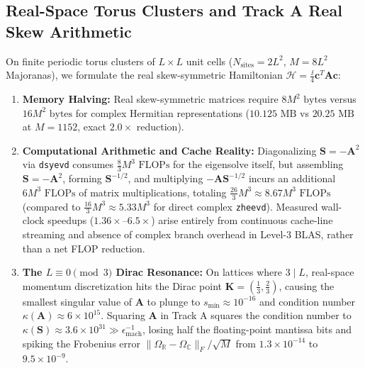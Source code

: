 \subsection{Real-Space Torus Clusters and Track A Real Skew Arithmetic}
On finite periodic torus clusters of $L \times L$ unit cells ($N_{\mathrm{sites}} = 2L^2$, $M = 8L^2$ Majoranas), we formulate the real skew-symmetric Hamiltonian $\mathcal{H} = \frac{\ii}{4} \mathbf{c}^T \mathbf{A} \mathbf{c}$:
\begin{enumerate}
\item \textbf{Memory Halving:} Real skew-symmetric matrices require $8 M^2 \text{ bytes}$ versus $16 M^2 \text{ bytes}$ for complex Hermitian representations ($10.125\text{ MB}$ vs $20.25\text{ MB}$ at $M=1152$, exact $2.0\times$ reduction).
\item \textbf{Computational Arithmetic and Cache Reality:} Diagonalizing $\mathbf{S} = -\mathbf{A}^2$ via \texttt{dsyevd} consumes $\frac{8}{3} M^3 \text{ FLOPs}$ for the eigensolve itself, but assembling $\mathbf{S} = -\mathbf{A}^2$, forming $\mathbf{S}^{-1/2}$, and multiplying $-\mathbf{A}\mathbf{S}^{-1/2}$ incurs an additional $6 M^3 \text{ FLOPs}$ of matrix multiplications, totaling $\frac{26}{3} M^3 \approx 8.67 M^3 \text{ FLOPs}$ (compared to $\frac{16}{3} M^3 \approx 5.33 M^3$ for direct complex \texttt{zheevd}). Measured wall-clock speedups ($1.36\times\text{--}6.5\times$) arise entirely from continuous cache-line streaming and absence of complex branch overhead in Level-3 BLAS, rather than a net FLOP reduction.
\item \textbf{The $L \equiv 0 \pmod 3$ Dirac Resonance:} On lattices where $3 \mid L$, real-space momentum discretization hits the Dirac point $\mathbf{K} = (\frac{1}{3}, \frac{2}{3})$, causing the smallest singular value of $\mathbf{A}$ to plunge to $s_{\min} \approx 10^{-16}$ and condition number $\kappa(\mathbf{A}) \approx 6 \times 10^{15}$. Squaring $\mathbf{A}$ in Track A squares the condition number to $\kappa(\mathbf{S}) \approx 3.6 \times 10^{31} \gg \epsilon_{\mathrm{mach}}^{-1}$, losing half the floating-point mantissa bits and spiking the Frobenius error $\|\Omega_{\mathbb{R}} - \Omega_{\mathbb{C}}\|_F / \sqrt{M}$ from $1.3 \times 10^{-14}$ to $9.5 \times 10^{-9}$.
\end{enumerate}

